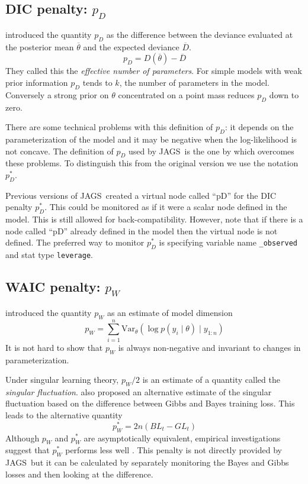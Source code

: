 \documentclass[11pt, a4paper, titlepage]{report}
\newcommand{\JAGS}{\textsf{JAGS}}
\begin{document}
{\subsection{DIC penalty: $p_D$}

\citet{spiegelhalter:etal:2002} introduced the quantity $p_D$ as the
difference between the deviance evaluated at the posterior mean
$\overline{\theta}$ and the expected deviance $\overline{D}$.
\[
p_D = D(\overline{\theta}) - \overline{D}
\]
They called this the {\em effective number of parameters}. For simple
models with weak prior information $p_D$ tends to $k$, the number of
parameters in the model. Conversely a strong prior on $\theta$
concentrated on a point mass reduces $p_D$ down to zero.

There are some technical problems with this definition of $p_D$: it
depends on the parameterization of the model and it may be negative
when the log-likelihood is not concave. The definition of $p_D$ used
by \JAGS\ is the one by \cite{plummer:2002, plummer:2008} which
overcomes these problems. To distinguish this from the original
version we use the notation $p^*_D$.

Previous versions of \JAGS\ created a virtual node called ``pD'' for
the DIC penalty $p^*_D$. This could be monitored as if it were a
scalar node defined in the model. This is still allowed for
back-compatibility. However, note that if there is a node called
``pD'' already defined in the model then the virtual node is not
defined. The preferred way to monitor $p^*_D$ is specifying variable
name \texttt{\_observed} and stat type \texttt{leverage}.

\subsection{WAIC penalty: $p_W$}

\citet{Watanabe2009Book} introduced the quantity $p_W$ as an estimate
of model dimension
\[
p_W = \sum_{i=1}^n \text{Var}_{\theta} \left( \log p(y_i \mid \theta) \mid y_{1:n} \right) 
\]
It is not hard to show that $p_W$ is always non-negative and invariant to changes
in parameterization.

Under singular learning theory, $p_W/2$ is an estimate of a quantity
called the {\em singular fluctuation}. \citet{Watanabe2009Book} also
proposed an alternative estimate of the singular fluctuation based on
the difference between Gibbs and Bayes training loss. This leads to
the alternative quantity
\[
p^*_W = 2n \left(BL_t - GL_t\right)
\]
Although $p_W$ and $p^*_W$ are asymptotically equivalent, empirical
investigations suggest that $p^*_W$ performs less well
\citep{Gelman2014}. This penalty is not directly provided by
\JAGS\ but it can be calculated by separately monitoring the Bayes and
Gibbs losses and then looking at the difference.

}
\end{document}
